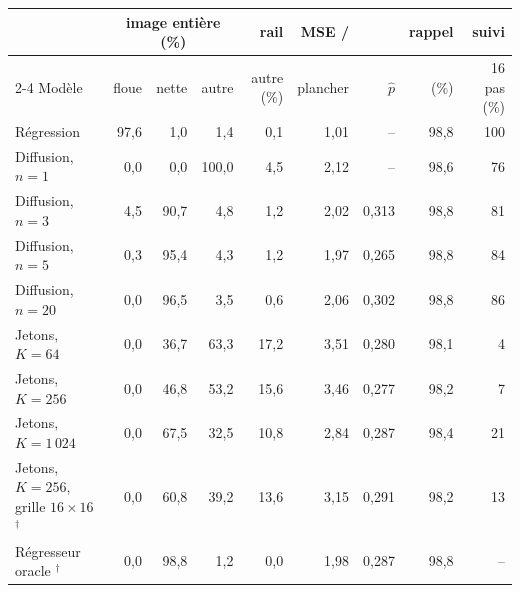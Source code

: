 \begin{tabular}{@{}lrrrrrrrr@{}}
\toprule
& \multicolumn{3}{c}{image entière (\%)} & rail & MSE / & & rappel & suivi \\
\cmidrule(lr){2-4}
Modèle & floue & nette & autre & autre (\%) & plancher & $\hat p$ & (\%) & 16 pas (\%) \\
\midrule
Régression & 97,6 & 1,0 & 1,4 & 0,1 & 1,01 & -- & 98,8 & 100 \\
Diffusion, $n=1$ & 0,0 & 0,0 & 100,0 & 4,5 & 2,12 & -- & 98,6 & 76 \\
Diffusion, $n=3$ & 4,5 & 90,7 & 4,8 & 1,2 & 2,02 & 0,313 & 98,8 & 81 \\
Diffusion, $n=5$ & 0,3 & 95,4 & 4,3 & 1,2 & 1,97 & 0,265 & 98,8 & 84 \\
Diffusion, $n=20$ & 0,0 & 96,5 & 3,5 & 0,6 & 2,06 & 0,302 & 98,8 & 86 \\
Jetons, $K=64$ & 0,0 & 36,7 & 63,3 & 17,2 & 3,51 & 0,280 & 98,1 & 4 \\
Jetons, $K=256$ & 0,0 & 46,8 & 53,2 & 15,6 & 3,46 & 0,277 & 98,2 & 7 \\
Jetons, $K=1\,024$ & 0,0 & 67,5 & 32,5 & 10,8 & 2,84 & 0,287 & 98,4 & 21 \\
Jetons, $K=256$, grille $16\times16$ $^\dagger$ & 0,0 & 60,8 & 39,2 & 13,6 & 3,15 & 0,291 & 98,2 & 13 \\
Régresseur oracle $^\dagger$ & 0,0 & 98,8 & 1,2 & 0,0 & 1,98 & 0,287 & 98,8 & -- \\
\bottomrule
\end{tabular}
